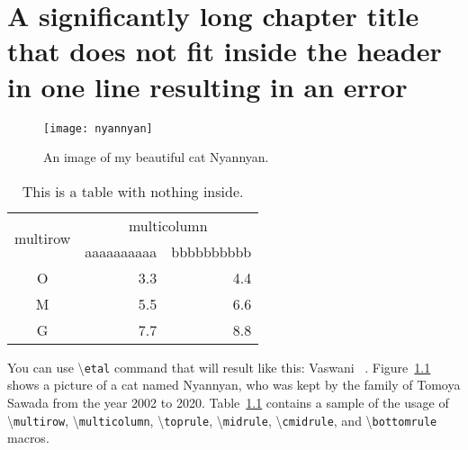 \chapter{A significantly long chapter title that does not fit inside the header in one line resulting in an error}


\begin{figure}
  \centering
  \texttt{[image: nyannyan]}  %
  \caption{An image of my beautiful cat Nyannyan.}
  \label{c:introduction:fig:nyannyan}
\end{figure}


\begin{table}
  \centering
  \caption{This is a table with nothing inside.}
  \label{c:introduction:tab:empty}
  \begin{tabular}{c|r|r}
    \toprule
    \multirow{2}{*}{multirow}  &  \multicolumn{2}{c}{multicolumn}                   \\
    \cmidrule(r){2-3}
                               &  \multicolumn{1}{c|}{aaaaaaaaaa}   &  \multicolumn{1}{c}{bbbbbbbbbb}  \\
    \midrule
    O                          &  3.3                               &  4.4                             \\
    M                          &  5.5                               &  6.6                             \\
    G                          &  7.7                               &  8.8                             \\
    \bottomrule
  \end{tabular}
\end{table}


You can use \textbackslash\texttt{etal} command that will result like this: Vaswani \etal~\cite{transformer_vaswani_2017}.
Figure~\ref{c:introduction:fig:nyannyan} shows a picture of a cat named Nyannyan, who was kept by the family of Tomoya Sawada from the year 2002 to 2020.
Table~\ref{c:introduction:tab:empty} contains a sample of the usage of \textbackslash\texttt{multirow}, \textbackslash\texttt{multicolumn}, \textbackslash\texttt{toprule}, \textbackslash\texttt{midrule}, \textbackslash\texttt{cmidrule}, and \textbackslash\texttt{bottomrule} macros.

\lipsum[1-3]
